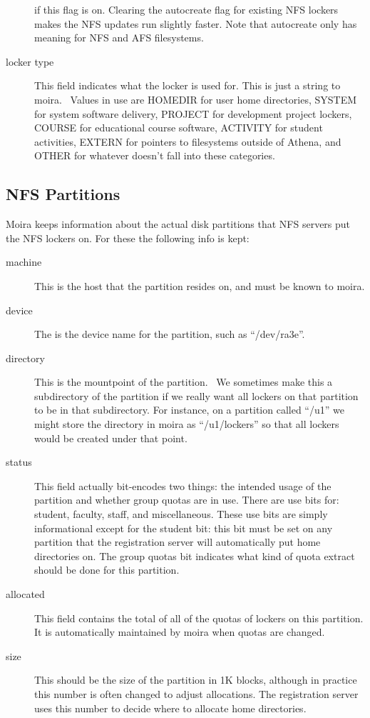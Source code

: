 \begin{description}
if this flag is on.  Clearing the autocreate flag for existing NFS
lockers makes the NFS updates run slightly faster.  Note that
autocreate only has meaning for NFS and AFS filesystems.  
\item[locker type] This field indicates what the locker is used for.  This
is just a string to moira.  \athena\ Values in use are HOMEDIR for
user home directories, SYSTEM for system software delivery, PROJECT
for development project lockers, COURSE for educational course
software, ACTIVITY for student activities, EXTERN for pointers to
filesystems outside of Athena, and OTHER for whatever doesn't fall
into these categories.  
\end{description}

\subsection{NFS Partitions}

\label{nfspartitions}
Moira keeps information about the actual disk partitions that NFS
servers put the NFS lockers on.  For these the following info is kept:
\begin{description}
\item[machine] This is the host that the partition resides on, and must be
known to moira.
\item[device] The is the device name for the partition, such as ``/dev/ra3e''.
\item[directory] This is the mountpoint of the partition.  \athena\  We
sometimes make this a subdirectory of the partition if we really want
all lockers on that partition to be in that subdirectory.  For
instance, on a partition called ``/u1'' we might store the directory
in moira as ``/u1/lockers'' so that all lockers would be created under
that point.
\item[status] This field actually bit-encodes two things: the intended usage
of the partition and whether group quotas are in use.  There are use
bits for: student, faculty, staff, and miscellaneous.  These use bits
are simply informational except for the student bit: this bit must be
set on any partition that the  registration server
will automatically put home directories on.   The
group quotas bit indicates what kind of quota extract should be done
for this partition.
\item[allocated] This field contains the total of all of the quotas of
lockers on this partition.  It is automatically maintained by moira
when quotas are changed.
\item[size] This should be the size of the partition in 1K blocks, although
in practice this number is often changed to adjust allocations.  The
registration server uses this number to decide where to allocate home
directories. 
\end{description}

